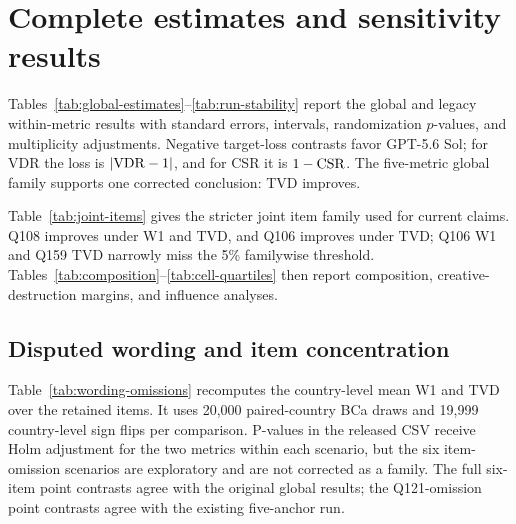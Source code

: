 \clearpage
\section{Complete estimates and sensitivity results}
\label{app:results}

Tables~\ref{tab:global-estimates}--\ref{tab:run-stability} report the global and legacy
within-metric results with standard errors, intervals, randomization $p$-values, and
multiplicity adjustments. Negative target-loss contrasts favor GPT-5.6 Sol; for VDR the
loss is $|\mathrm{VDR}-1|$, and for CSR it is $1-\mathrm{CSR}$. The five-metric global family supports
one corrected conclusion: TVD improves.



Table~\ref{tab:joint-items} gives the stricter joint item family used for current claims.
Q108 improves under W1 and TVD, and Q106 improves under TVD; Q106 W1 and Q159 TVD
narrowly miss the 5\% familywise threshold. Tables~\ref{tab:composition}--\ref{tab:cell-quartiles}
then report composition, creative-destruction margins, and influence analyses.



\subsection{Disputed wording and item concentration}
Table~\ref{tab:wording-omissions} recomputes the country-level mean W1 and TVD
over the retained items. It uses 20,000 paired-country BCa draws and 19,999
country-level sign flips per comparison. P-values in the released CSV receive
Holm adjustment for the two metrics within each scenario, but the six
item-omission scenarios are exploratory and are not corrected as a family.
The full six-item point contrasts agree with the original global results;
the Q121-omission point contrasts agree with the existing five-anchor run.

